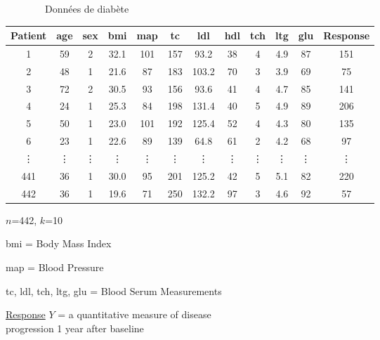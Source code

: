 \documentclass{article}
\begin{document}
\centerline{\Huge \ \ \ \ \ \ \ \ Donn\'ees de diab\`ete}

\begin{large}
\begin{center}
\begin{tabular}{|c||c|c|c|c|c|c|c|c|c|c||c|}
\hline
Patient&age&sex&bmi&map&tc&ldl&hdl&tch&ltg&glu&Response\\\hline
1&59&2&32.1&101&157&93.2&38&4&4.9&87&151\\
2&48&1&21.6&87&183&103.2&70&3&3.9&69&75\\
3&72&2&30.5&93&156&93.6&41&4&4.7&85&141\\
4&24&1&25.3&84&198&131.4&40&5&4.9&89&206\\
5&50&1&23.0&101&192&125.4&52&4&4.3&80&135\\
6&23&1&22.6&89&139&64.8&61&2&4.2&68&97\\
\vdots&\vdots&\vdots&\vdots&\vdots&\vdots&\vdots&\vdots&\vdots&\vdots&\vdots&\vdots\\
441&36&1&30.0&95&201&125.2&42&5&5.1&82&220\\
442&36&1&19.6&71&250&132.2&97&3&4.6&92&57\\\hline
\end{tabular}
\end{center}

{\Large $n$=442, $k$=10

\medskip

bmi = Body Mass Index

\medskip

map = Blood Pressure

\medskip

tc, ldl, tch, ltg, glu = Blood Serum Measurements

\medskip

\noindent

\underline{Response} $Y$ = a quantitative measure of disease\\
progression 1 year after baseline}

\end{large}
\end{document}
